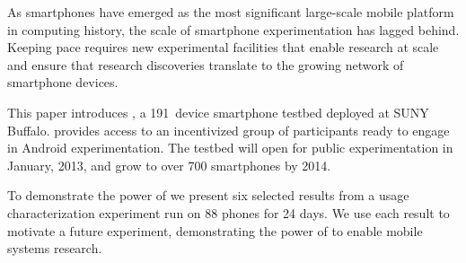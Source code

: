 As smartphones have emerged as the most significant large-scale mobile
platform in computing history, the scale of smartphone experimentation has
lagged behind. Keeping pace requires new experimental facilities that enable
research at scale and ensure that research discoveries translate to the
growing network of smartphone devices.


This paper introduces \PhoneLab{}, a 191~device smartphone testbed deployed
at SUNY Buffalo. \PhoneLab{} provides access to an incentivized group of
participants ready to engage in Android experimentation. The testbed will
open for public experimentation in January, 2013, and grow to over 700
smartphones by 2014.



To demonstrate the power of \PhoneLab{} we present six selected results from
a usage characterization experiment run on 88 phones for 24 days. We use each
result to motivate a future \PhoneLab{} experiment, demonstrating the power
of \PhoneLab{} to enable mobile systems research.
